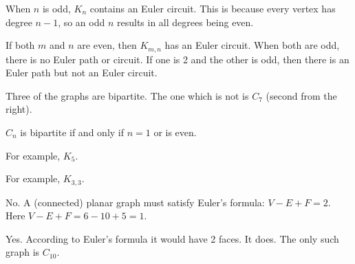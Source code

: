 \documentclass[11pt]{exam}
\newcommand{\vtx}[2]{node[fill,circle,inner sep=0pt, minimum size=7pt,label=#1:#2]{}}
\renewcommand{\v}{\vtx{above}{}}
\begin{document}
\begin{questions}
\question When $n$ is odd, $K_n$ contains an Euler circuit.  This is because every vertex has degree $n-1$, so an odd $n$ results in all degrees being even.%

\question If both $m$ and $n$ are even, then $K_{m,n}$ has an Euler circuit.  When both are odd, there is no Euler path or circuit.  If one is 2 and the other is odd, then there is an Euler path but not an Euler circuit. %

\question Three of the graphs are bipartite.  The one which is not is $C_7$ (second from the right). %
% 
% 

\question $C_n$ is bipartite if and only if $n = 1$ or is even.%

\question For example, $K_5$. %

\question For example, $K_{3,3}$. %

\question No.  A (connected) planar graph must satisfy Euler's formula: $V - E + F = 2$.  Here $V - E + F = 6 - 10 + 5 = 1$. %

\question Yes.  According to Euler's formula it would have 2 faces.  It does.  The only such graph is $C_{10}$. %


\end{questions}
\end{document}
